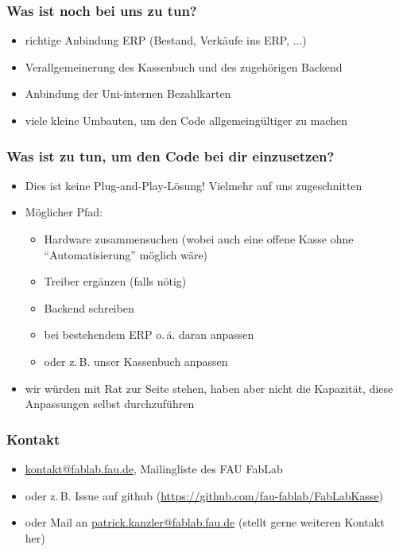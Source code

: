 \documentclass[t]{beamer}
\begin{document}
\begin{frame}
\frametitle{Was ist noch bei uns zu tun?}
 \begin{itemize}
   \item richtige Anbindung ERP (Bestand, Verkäufe ins ERP, ...)
   \item Verallgemeinerung des Kassenbuch und des zugehörigen Backend
   \item Anbindung der Uni-internen Bezahlkarten
   \item viele kleine Umbauten, um den Code allgemeingültiger zu machen
 \end{itemize} 
\end{frame}

\begin{frame}
\frametitle{Was ist zu tun, um den Code bei dir einzusetzen?}
  \begin{itemize}
    \item Dies ist keine Plug-and-Play-Lösung! Vielmehr auf uns zugeschnitten
    \item Möglicher Pfad:
      \begin{itemize}
         \item Hardware zusammensuchen (wobei auch eine offene Kasse ohne \enquote{Automatisierung} möglich wäre)
         \item Treiber ergänzen (falls nötig)
         \item Backend schreiben
         \item bei bestehendem ERP o.\,ä. daran anpassen
         \item oder z.\,B. unser Kassenbuch anpassen
      \end{itemize}
    \item wir würden mit Rat zur Seite stehen, haben aber nicht die Kapazität, diese Anpassungen selbst durchzuführen
  \end{itemize}
\end{frame}

\begin{frame}
\frametitle{Kontakt}
 \begin{itemize}
  \item \url{kontakt@fablab.fau.de}, Mailingliste des FAU FabLab
  \item oder z.\,B. Issue auf github (\url{https://github.com/fau-fablab/FabLabKasse})
  \item oder Mail an \url{patrick.kanzler@fablab.fau.de} (stellt gerne weiteren Kontakt her)
 \end{itemize}
\end{frame}
\end{document}
